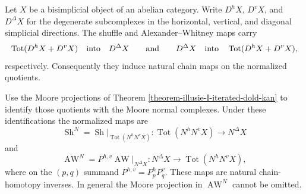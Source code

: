\begin{lemma}
\label{lemma-illusie-I-normalized-eilenberg-zilber}
Let $X$ be a bisimplicial object of an abelian category. Write
$D^hX$, $D^vX$, and $D^\Delta X$ for the degenerate subcomplexes in the
horizontal, vertical, and diagonal simplicial directions. The shuffle and
Alexander--Whitney maps carry
\[
 \operatorname{Tot}(D^hX+D^vX)\quad\hbox{into}\quad D^\Delta X
 \qquad\hbox{and}\qquad
 D^\Delta X\quad\hbox{into}\quad
 \operatorname{Tot}(D^hX+D^vX),
\]
respectively. Consequently they induce natural chain maps on the normalized
quotients.

Use the Moore projections of Theorem
\ref{theorem-illusie-I-iterated-dold-kan} to identify those quotients with
the Moore normal complexes. Under these identifications the normalized maps
are
\[
 \operatorname{Sh}^N=
 \operatorname{Sh}|_{\operatorname{Tot}(N^hN^vX)}:
 \operatorname{Tot}(N^hN^vX)\longrightarrow N^\Delta X
\]
and
\[
 \operatorname{AW}^N=
 P^{h,v}\operatorname{AW}|_{N^\Delta X}:
 N^\Delta X\longrightarrow\operatorname{Tot}(N^hN^vX),
\]
where on the $(p,q)$ summand $P^{h,v}=P^h_pP^v_q$. These maps are natural
chain-homotopy inverses. In general the Moore projection in
$\operatorname{AW}^N$ cannot be omitted.
\end{lemma}

